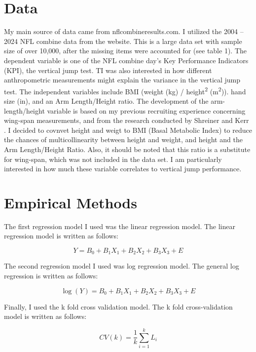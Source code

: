 \documentclass[12pt]{article}
\begin{document}
\section*{Data}
My main source of data came from nflcombineresults.com. I utilized the 2004 -- 2024 NFL combine data from the website. This is a large data set with sample size of over 10,000, after the missing items were accounted for (see table 1). The dependent variable is one of the NFL combine day's Key Performance Indicators (KPI), the vertical jump test. TI was also interested in how different anthropometric measurements might explain the variance in the vertical jump test. The independent variables include BMI (weight (kg) / height\textsuperscript{2} (m\textsuperscript{2})). hand size (in), and an Arm Length/Height ratio. The development of the arm-length/height variable is based on my previous recruiting experience concerning wing-span measurements, and from the research conducted by Shreiner and Kerr \parencite{ackland1997absolute}. I decided to covnvet height and weigt to BMI (Basal Metabolic Index) to reduce the chances of multicollinearity between height and weight, and height and the Arm Length/Height Ratio. Also, it should be noted that this ratio is a substitute for wing-span, which was not included in the data set. I am particularly interested in how much these variable correlates to vertical jump performance.

\section*{Empirical Methods}
The first regression model I used was the linear regression model. The linear regression model is written as follows:

\begin{equation*}
    Y = B_0 + B_1X_1 + B_2X_2 + B_3X_3 + E
\end{equation*}

The second regression model I used was log regression model. The general log regression is written as follows:

\begin{equation*}
    \log(Y) = B_0 + B_1X_1 + B_2X_2 + B_3X_3 + E
\end{equation*}

Finally, I used the k fold cross validation model. The k fold cross-validation model is written as follows:

\begin{equation*}
    CV(k) = \frac{1}{k} \sum_{i=1}^{k} L_i
\end{equation*}
\end{document}
